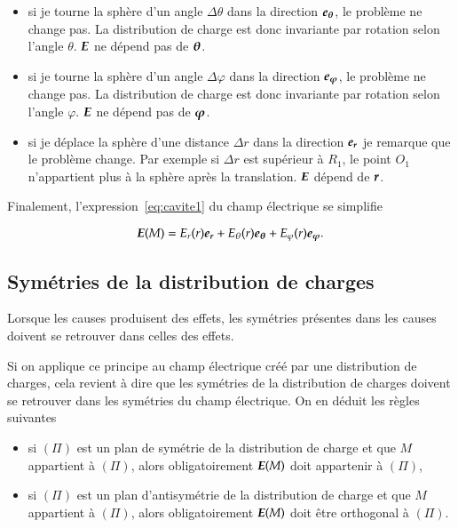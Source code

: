 \begin{itemize}
	\item  si je tourne la sphère d'un angle $\Delta \theta$ dans la
	  direction $\etheta$, le problème
	  ne change pas. La distribution de charge est donc invariante 
	  par rotation selon l'angle $\theta$. $\vece$ ne dépend pas de
	  $\mitbf{\theta}$.

	  \item  si je tourne la sphère d'un angle $\Delta \varphi$ dans la
	  direction $\ephi$, le problème
	  ne change pas. La distribution de charge est donc invariante 
	  par rotation selon l'angle $\varphi$. $\vece$ ne dépend pas de
	  $\mitbf{\varphi}$.
  	\item si je déplace la sphère d'une distance $\Delta r$ dans la direction
	$\er$ je remarque que le problème change. Par exemple si $\Delta r$ 
	est supérieur à $R_1$, le point $O_1$ n'appartient plus à la sphère après
	la translation. $\vece$ dépend de $\mitbf{r}$.

\end{itemize}

Finalement, l'expression~\ref{eq:cavite1} du champ électrique se simplifie

\begin{equation}
	\vece(M) = E_r(r)\er + E_\theta(r)\etheta + E_\varphi(r)\ephi.
\end{equation}
\subsection{Symétries de la distribution de charges}

\begin{defn}
	Lorsque les causes produisent des effets, les symétries présentes dans les
	causes doivent se retrouver dans celles des effets.
\end{defn}

Si on applique ce principe au champ électrique créé par une distribution 
de charges, cela revient à dire que les symétries de la distribution de 
charges doivent se retrouver dans les symétries du champ électrique. On en 
déduit les règles suivantes

\begin{defn}
  \begin{itemize}
  \item si $(\Pi)$ est un plan de symétrie de la distribution de charge et que 
    $M$ appartient à $(\Pi)$, alors obligatoirement $\vece(M)$ doit 
    appartenir à $(\Pi)$,
  \item si $(\Pi)$ est un plan d'antisymétrie de la distribution de charge 
    et que $M$ appartient à $(\Pi)$, alors obligatoirement $\vece(M)$ doit 
    être orthogonal à $(\Pi)$.
  \end{itemize}
\end{defn}

